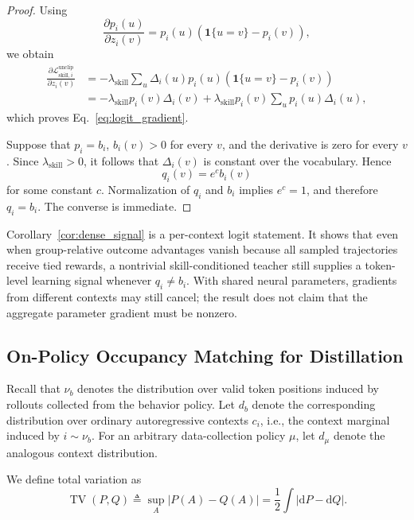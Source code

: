 \documentclass{llmxive}
\begin{document}
\begin{proof}
Using
\[
 \frac{\partial p_i(u)}{\partial z_i(v)}
 =
 p_i(u)
 \left(
   \mathbf 1\{u=v\}-p_i(v)
 \right),
\]
we obtain
\begin{align*}
 \frac{
   \partial
   \mathcal L_{\mathrm{skill},i}^{\mathrm{unclip}}
 }{
   \partial z_i(v)
 }
 &=
 -
 \lambda_{\mathrm{skill}}
 \sum_u
 \Delta_i(u)
 p_i(u)
 \left(
   \mathbf 1\{u=v\}-p_i(v)
 \right)
 \\
 &=
 -
 \lambda_{\mathrm{skill}}
 p_i(v)\Delta_i(v)
 +
 \lambda_{\mathrm{skill}}
 p_i(v)
 \sum_u p_i(u)\Delta_i(u),
\end{align*}
which proves Eq.~\ref{eq:logit_gradient}.

Suppose that \(p_i=b_i\), \(b_i(v)>0\) for every \(v\), and the derivative
is zero for every \(v\). Since
\(\lambda_{\mathrm{skill}}>0\), it follows that
\(\Delta_i(v)\) is constant over the vocabulary. Hence
\[
 q_i(v)=e^c b_i(v)
\]
for some constant \(c\). Normalization of \(q_i\) and \(b_i\) implies
\(e^c=1\), and therefore \(q_i=b_i\). The converse is immediate.
\end{proof}

Corollary~\ref{cor:dense_signal} is a per-context logit statement. It shows
that even when group-relative outcome advantages vanish because all sampled
trajectories receive tied rewards, a nontrivial skill-conditioned teacher
still supplies a token-level learning signal whenever \(q_i\neq b_i\).
With shared neural parameters, gradients from different contexts may still
cancel; the result does not claim that the aggregate parameter gradient must
be nonzero.

\subsection{On-Policy Occupancy Matching for Distillation}
\label{app:occupancy_matching}

Recall that \(\nu_b\) denotes the distribution over valid token positions
induced by rollouts collected from the behavior policy. Let \(d_b\) denote
the corresponding distribution over ordinary autoregressive contexts
\(c_i\), i.e., the context marginal induced by \(i\sim\nu_b\). For an
arbitrary data-collection policy \(\mu\), let \(d_\mu\) denote the analogous
context distribution.

We define total variation as
\begin{equation*}
 \operatorname{TV}(P,Q)
 \triangleq
 \sup_A |P(A)-Q(A)|
 =
 \frac{1}{2}
 \int
 \left|
   \mathrm dP-\mathrm dQ
 \right|.
\end{equation*}
\end{document}
